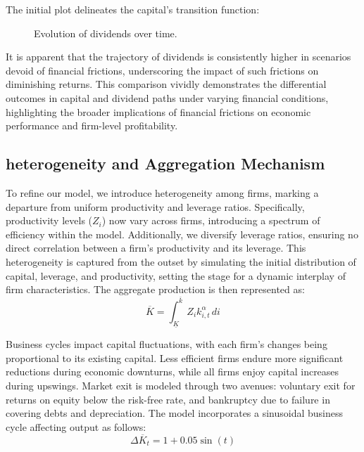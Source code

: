 \documentclass[12pt]{article}
\begin{document}
The initial plot delineates the capital's transition function:

\begin{figure}[H]
    \centering
    \caption{Evolution of dividends over time.}
    \label{fig:dividendsEvolution}
\end{figure}

It is apparent that the trajectory of dividends is consistently higher in scenarios devoid of financial frictions,
underscoring the impact of such frictions on diminishing returns. This comparison vividly demonstrates the differential
outcomes in capital and dividend paths under varying financial conditions, highlighting the broader implications of
financial frictions on economic performance and firm-level profitability. 

\subsection{heterogeneity and Aggregation Mechanism}

To refine our model, we introduce heterogeneity among firms, marking a departure from uniform productivity and leverage
ratios.  Specifically, productivity levels (\( Z_i \)) now vary across firms, introducing a spectrum of efficiency within
the model. Additionally, we diversify leverage ratios, ensuring no direct correlation between a firm's productivity and
its leverage. This heterogeneity is captured from the outset by simulating the initial distribution of capital,
leverage, and productivity, setting the stage for a dynamic interplay of firm characteristics. The aggregate production
is then represented as:
\[
\overline{K} = \int_{\underline{K} }^{\overline{k} }Z_i k_{i,t}^{\alpha}\,di
\]

Business cycles impact capital fluctuations, with each firm's changes being proportional to its existing capital. Less
efficient  firms endure more significant reductions during economic downturns, while all firms enjoy capital increases
during upswings. Market exit is modeled through two avenues: voluntary exit for returns on equity below the risk-free
rate, and bankruptcy due to failure in covering debts and depreciation. The model incorporates a sinusoidal business
cycle affecting output as follows:
\[
\Delta \overline{K}_t = 1 + 0.05 \sin(t)
\]
\end{document}
